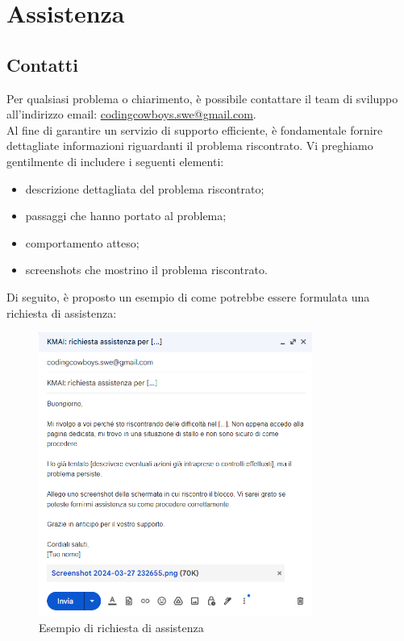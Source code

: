 \chapter{Assistenza} \label{cap:assistenza}

\section{Contatti}
Per qualsiasi problema o chiarimento, è possibile contattare il team di sviluppo all'indirizzo email: \href{mailto:codingcowboys.swe@gmail.com}{codingcowboys.swe@gmail.com}. \\
Al fine di garantire un servizio di supporto efficiente, è fondamentale fornire dettagliate informazioni riguardanti il problema riscontrato. Vi preghiamo gentilmente di includere i seguenti elementi:
    \begin{itemize}
        \item descrizione dettagliata del problema riscontrato;
        \item passaggi che hanno portato al problema;
        \item comportamento atteso;
        \item screenshots che mostrino il problema riscontrato.
    \end{itemize}

Di seguito, è proposto un esempio di come potrebbe essere formulata una richiesta di assistenza:
\begin{figure}[h!]
    \centering
    \includegraphics[width=0.8\textwidth]{mailEsempio.png}
    \caption{Esempio di richiesta di assistenza}\label{fig:esempio_richiesta_assistenza}
\end{figure}